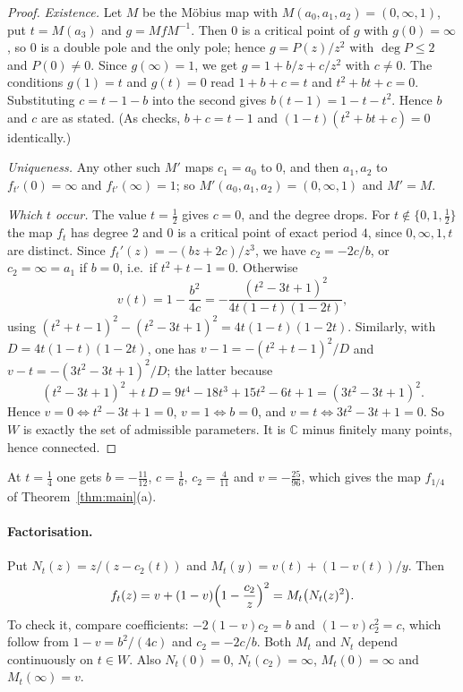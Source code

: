 \documentclass[11pt]{article}
\theoremstyle{definition}
\begin{document}
\begin{proof}
\emph{Existence.} Let $M$ be the M\"obius map with $M(a_0,a_1,a_2)=(0,\infty,1)$, put $t=M(a_3)$ and $g=MfM^{-1}$. Then $0$ is a critical point of $g$ with $g(0)=\infty$, so $0$ is a double pole and the only pole; hence $g=P(z)/z^2$ with $\deg P\le2$ and $P(0)\ne0$. Since $g(\infty)=1$, we get $g=1+b/z+c/z^2$ with $c\ne0$. The conditions $g(1)=t$ and $g(t)=0$ read $1+b+c=t$ and $t^2+bt+c=0$. Substituting $c=t-1-b$ into the second gives $b(t-1)=1-t-t^2$. Hence $b$ and $c$ are as stated. (As checks, $b+c=t-1$ and $(1-t)(t^2+bt+c)=0$ identically.)

\emph{Uniqueness.} Any other such $M'$ maps $c_1=a_0$ to $0$, and then $a_1,a_2$ to $f_{t'}(0)=\infty$ and $f_{t'}(\infty)=1$; so $M'(a_0,a_1,a_2)=(0,\infty,1)$ and $M'=M$.

\emph{Which $t$ occur.} The value $t=\tfrac12$ gives $c=0$, and the degree drops. For $t\notin\{0,1,\tfrac12\}$ the map $f_t$ has degree $2$ and $0$ is a critical point of exact period $4$, since $0,\infty,1,t$ are distinct. Since $f_t'(z)=-(bz+2c)/z^3$, we have $c_2=-2c/b$, or $c_2=\infty=a_1$ if $b=0$, i.e.\ if $t^2+t-1=0$. Otherwise
\[v(t)=1-\frac{b^2}{4c}=-\frac{(t^2-3t+1)^2}{4t(1-t)(1-2t)},\]
using $(t^2+t-1)^2-(t^2-3t+1)^2=4t(1-t)(1-2t)$. Similarly, with $D=4t(1-t)(1-2t)$, one has $v-1=-(t^2+t-1)^2/D$ and $v-t=-(3t^2-3t+1)^2/D$; the latter because
\[(t^2-3t+1)^2+t\,D=9t^4-18t^3+15t^2-6t+1=(3t^2-3t+1)^2.\]
Hence $v=0\iff t^2-3t+1=0$, $v=1\iff b=0$, and $v=t\iff 3t^2-3t+1=0$. So $W$ is exactly the set of admissible parameters. It is $\mathbb C$ minus finitely many points, hence connected.
\end{proof}

At $t=\tfrac14$ one gets $b=-\tfrac{11}{12}$, $c=\tfrac16$, $c_2=\tfrac4{11}$ and $v=-\tfrac{25}{96}$, which gives the map $f_{1/4}$ of Theorem~\ref{thm:main}(a).

\paragraph{Factorisation.} Put $N_t(z)=z/(z-c_2(t))$ and $M_t(y)=v(t)+(1-v(t))/y$. Then
\begin{equation}\label{eq:factor}
f_t(z)=v+(1-v)\Bigl(1-\frac{c_2}{z}\Bigr)^2=M_t\bigl(N_t(z)^2\bigr).
\end{equation}
To check it, compare coefficients: $-2(1-v)c_2=b$ and $(1-v)c_2^2=c$, which follow from $1-v=b^2/(4c)$ and $c_2=-2c/b$. Both $M_t$ and $N_t$ depend continuously on $t\in W$. Also $N_t(0)=0$, $N_t(c_2)=\infty$, $M_t(0)=\infty$ and $M_t(\infty)=v$.
\end{document}
